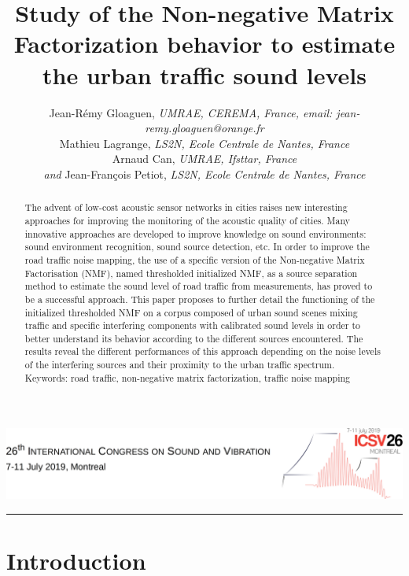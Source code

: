 \documentclass[12pt,english,twoside]{article}
\title{Study of the Non-negative Matrix Factorization behavior to estimate the urban traffic sound levels}
\author{
Jean-R\'emy Gloaguen, {\small \textit{UMRAE, CEREMA, France, email: jean-remy.gloaguen@orange.fr}}
\medskip
\\
Mathieu Lagrange, {\small \textit{LS2N, Ecole Centrale de Nantes, France}}
\medskip
\\
Arnaud Can, {\small \textit{UMRAE, Ifsttar, France}}
\medskip
\\
\emph{and} Jean-Fran\c cois Petiot, 
{\small \textit{LS2N, Ecole Centrale de Nantes, France}}}
\makeatletter
\def\maketitle{ 
  \thispagestyle{firstpage} 
\noindent\includegraphics[width=\textwidth]{ICSV26-header.png}\\
  {
   \fontsize{17}{20}\selectfont\sffamily{}  \noindent \MakeUppercase{\textbf{\@title}}
  
   \bigskip
   \fontsize{14}{20}\selectfont\rmfamily{} \noindent \@author
  } 
}
\makeatother
\begin{document}
\maketitle

\renewcommand{\abstractname}{\vspace{-\baselineskip}} %

\begin{abstract}	\noindent
The advent of low-cost acoustic sensor networks in cities raises new interesting approaches for improving the monitoring of the acoustic quality of cities. Many innovative approaches are developed to improve knowledge on sound environments: sound environment recognition, sound source detection, etc. In order to improve the road traffic noise mapping, the use of a specific version of the Non-negative Matrix Factorisation (NMF), named thresholded initialized NMF, as a source separation method to estimate the sound level of road traffic from measurements, has proved to be a successful approach.
This paper proposes to further detail the functioning of the initialized thresholded NMF on a corpus composed of urban sound scenes mixing traffic and specific interfering components with calibrated sound levels in order to better understand its behavior according to the different sources encountered.
The results reveal the different performances of this approach depending on the noise levels of the interfering sources and their proximity to the urban traffic spectrum.\\

\noindent Keywords: road traffic, non-negative matrix factorization, traffic noise mapping
\end{abstract}

\quad\rule{425pt}{0.4pt}


\section{Introduction} 
\end{document}
